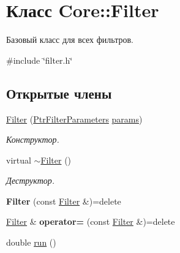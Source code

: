 \hypertarget{class_core_1_1_filter}{}\section{Класс Core\+:\+:Filter}
\label{class_core_1_1_filter}


Базовый класс для всех фильтров.  




{\ttfamily \#include \char`\"{}filter.\+h\char`\"{}}

\subsection*{Открытые члены}
\begin{DoxyCompactItemize}
\item 
\hypertarget{class_core_1_1_filter_af1ac0dfc8813579e0173b315c5a3fcad}{}\label{class_core_1_1_filter_af1ac0dfc8813579e0173b315c5a3fcad} 
\hyperlink{class_core_1_1_filter_af1ac0dfc8813579e0173b315c5a3fcad}{Filter} (\hyperlink{namespace_core_a4811af8148ba137d644b9a61a042cf03}{Ptr\+Filter\+Parameters} \hyperlink{class_core_1_1_filter_a44aa749b49ba46256975ce545531ecf7}{params})
\begin{DoxyCompactList}\small\item\em Конструктор. \end{DoxyCompactList}\item 
\hypertarget{class_core_1_1_filter_a38353602e4df00367d49263dc6368268}{}\label{class_core_1_1_filter_a38353602e4df00367d49263dc6368268} 
virtual \hyperlink{class_core_1_1_filter_a38353602e4df00367d49263dc6368268}{$\sim$\+Filter} ()
\begin{DoxyCompactList}\small\item\em Деструктор. \end{DoxyCompactList}\item 
\hypertarget{class_core_1_1_filter_a76a8aef5adae9aa13ffb96e2b2398b4f}{}\label{class_core_1_1_filter_a76a8aef5adae9aa13ffb96e2b2398b4f} 
{\bfseries Filter} (const \hyperlink{class_core_1_1_filter}{Filter} \&)=delete
\item 
\hypertarget{class_core_1_1_filter_a7e05e62d95d655d1e23e4a8485baedb7}{}\label{class_core_1_1_filter_a7e05e62d95d655d1e23e4a8485baedb7} 
\hyperlink{class_core_1_1_filter}{Filter} \& {\bfseries operator=} (const \hyperlink{class_core_1_1_filter}{Filter} \&)=delete
\item 
double \hyperlink{class_core_1_1_filter_ad5070e695763edc66d211651b98c09f1}{run} ()

\end{DoxyCompactItemize}

